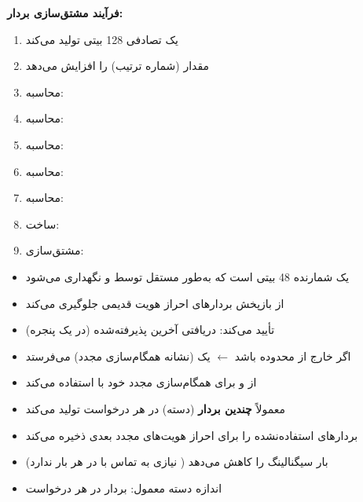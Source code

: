 \textbf{فرآیند مشتق‌سازی بردار:}

\begin{enumerate}
\def\labelenumi{\arabic{enumi}.}
\tightlist
\item
   یک  تصادفی 128 بیتی تولید می‌کند
\item
   مقدار  (شماره ترتیب) را افزایش می‌دهد
\item
  محاسبه: 
\item
  محاسبه: 
\item
  محاسبه: 
\item
  محاسبه: 
\item
  محاسبه: 
\item
  ساخت: 
\item
  مشتق‌سازی: 
\end{enumerate}


\begin{itemize}
\tightlist
\item
   یک شمارنده 48 بیتی است که به‌طور مستقل توسط  و  نگهداری می‌شود
\item
  از بازپخش بردارهای احراز هویت قدیمی جلوگیری می‌کند
\item
   تأیید می‌کند:  دریافتی \lr{\textgreater{}} آخرین  پذیرفته‌شده (در یک پنجره)
\item
  اگر  خارج از محدوده باشد \ensuremath{\leftarrow}  یک  (نشانه همگام‌سازی مجدد) می‌فرستد
\item
   از  و  برای همگام‌سازی مجدد  خود با  استفاده می‌کند
\end{itemize}


\begin{itemize}
\tightlist
\item
   معمولاً \textbf{چندین بردار} (دسته) در هر درخواست تولید می‌کند
\item
   بردارهای استفاده‌نشده را برای احراز هویت‌های مجدد بعدی ذخیره می‌کند
\item
  بار سیگنالینگ را کاهش می‌دهد ( نیازی به تماس با  در هر بار ندارد)
\item
  اندازه دسته معمول:  بردار در هر درخواست 
\end{itemize}

